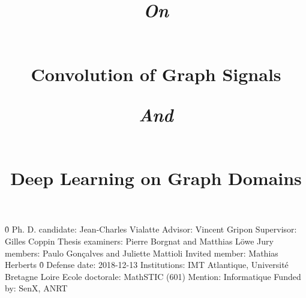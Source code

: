 \documentclass[12pt]{book}
\begin{document}

%
%

\pagestyle{empty}
\newline
\newline
\h{0}\newline
Ph. D. candidate: Jean-Charles Vialatte\newline
Advisor: Vincent Gripon\newline
Supervisor: Gilles Coppin\newline
Thesis examiners: Pierre Borgnat and Matthias Löwe\newline
Jury members: Paulo Gonçalves and Juliette Mattioli\newline
Invited member: Mathias Herberts\newline
\h{0}\newline
Defense date: 2018-12-13\newline
Institutions: IMT Atlantique, Université Bretagne Loire\newline
Ecole doctorale: MathSTIC (601)\newline
Mention: Informatique\newline
Funded by: SenX, ANRT


%

%
%

\title{\begin{large}\emph{On}\end{large}\\Convolution of Graph Signals\\\begin{large}\emph{And}\end{large}\\Deep Learning on Graph Domains}
\date{}
\maketitle

%
%

\frontmatter
\pagestyle{plain}


%
%

 \dominitoc
 \tableofcontents
 \adjustmtc



\end{document}
